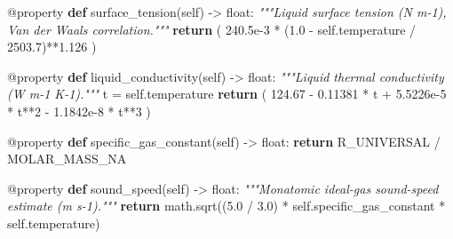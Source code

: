 \documentclass[
  12pt,
  12pt,a4paper,oneside]{report}
\newenvironment{Shaded}{}{}
\newcommand{\AttributeTok}[1]{\textcolor[rgb]{0.49,0.56,0.16}{#1}}
\newcommand{\BuiltInTok}[1]{\textcolor[rgb]{0.00,0.50,0.00}{#1}}
\newcommand{\CommentTok}[1]{\textcolor[rgb]{0.38,0.63,0.69}{\textit{#1}}}
\newcommand{\ControlFlowTok}[1]{\textcolor[rgb]{0.00,0.44,0.13}{\textbf{#1}}}
\newcommand{\DecValTok}[1]{\textcolor[rgb]{0.25,0.63,0.44}{#1}}
\newcommand{\FloatTok}[1]{\textcolor[rgb]{0.25,0.63,0.44}{#1}}
\newcommand{\KeywordTok}[1]{\textcolor[rgb]{0.00,0.44,0.13}{\textbf{#1}}}
\newcommand{\NormalTok}[1]{#1}
\newcommand{\OperatorTok}[1]{\textcolor[rgb]{0.40,0.40,0.40}{#1}}
\newcommand{\VariableTok}[1]{\textcolor[rgb]{0.10,0.09,0.49}{#1}}
\begin{document}
\begin{Shaded}
\begin{Highlighting}[]
    \AttributeTok{@property}
    \KeywordTok{def}\NormalTok{ surface\_tension(}\VariableTok{self}\NormalTok{) }\OperatorTok{{-}\textgreater{}} \BuiltInTok{float}\NormalTok{:}
        \CommentTok{"""Liquid surface tension (N m{-}1), Van der Waals correlation."""}
        \ControlFlowTok{return}\NormalTok{ (}
            \FloatTok{240.5e{-}3} \OperatorTok{*}\NormalTok{ (}\FloatTok{1.0} \OperatorTok{{-}} \VariableTok{self}\NormalTok{.temperature }\OperatorTok{/} \FloatTok{2503.7}\NormalTok{)}\OperatorTok{**}\FloatTok{1.126}
\NormalTok{        )}

    \AttributeTok{@property}
    \KeywordTok{def}\NormalTok{ liquid\_conductivity(}\VariableTok{self}\NormalTok{) }\OperatorTok{{-}\textgreater{}} \BuiltInTok{float}\NormalTok{:}
        \CommentTok{"""Liquid thermal conductivity (W m{-}1 K{-}1)."""}
\NormalTok{        t }\OperatorTok{=} \VariableTok{self}\NormalTok{.temperature}
        \ControlFlowTok{return}\NormalTok{ (}
            \FloatTok{124.67} \OperatorTok{{-}} \FloatTok{0.11381} \OperatorTok{*}\NormalTok{ t }\OperatorTok{+} \FloatTok{5.5226e{-}5} \OperatorTok{*}\NormalTok{ t}\OperatorTok{**}\DecValTok{2}
            \OperatorTok{{-}} \FloatTok{1.1842e{-}8} \OperatorTok{*}\NormalTok{ t}\OperatorTok{**}\DecValTok{3}
\NormalTok{        )}

    \AttributeTok{@property}
    \KeywordTok{def}\NormalTok{ specific\_gas\_constant(}\VariableTok{self}\NormalTok{) }\OperatorTok{{-}\textgreater{}} \BuiltInTok{float}\NormalTok{:}
        \ControlFlowTok{return}\NormalTok{ R\_UNIVERSAL }\OperatorTok{/}\NormalTok{ MOLAR\_MASS\_NA}

    \AttributeTok{@property}
    \KeywordTok{def}\NormalTok{ sound\_speed(}\VariableTok{self}\NormalTok{) }\OperatorTok{{-}\textgreater{}} \BuiltInTok{float}\NormalTok{:}
        \CommentTok{"""Monatomic ideal{-}gas sound{-}speed estimate (m s{-}1)."""}
        \ControlFlowTok{return}\NormalTok{ math.sqrt((}\FloatTok{5.0} \OperatorTok{/} \FloatTok{3.0}\NormalTok{) }\OperatorTok{*} \VariableTok{self}\NormalTok{.specific\_gas\_constant }\OperatorTok{*} \VariableTok{self}\NormalTok{.temperature)}


\end{Highlighting}
\end{Shaded}
\end{document}
